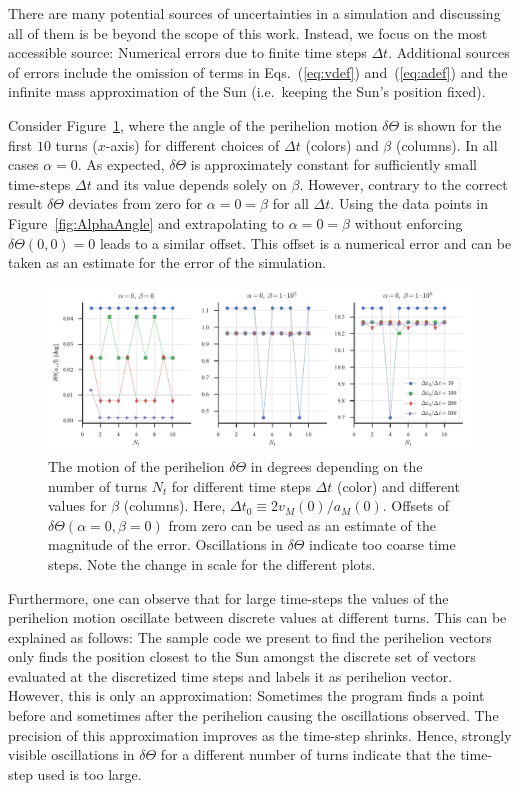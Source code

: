 \documentclass[12pt,ngerman,american]{iopart}
\begin{document}
There are many potential sources of uncertainties in a simulation and discussing all of them is be beyond the scope of this work.
Instead, we focus on the most accessible source: Numerical errors due to finite time steps $\Delta t$.
Additional sources of errors include the omission of terms in Eqs.~(\ref{eq:vdef}) and~(\ref{eq:adef}) and the infinite mass approximation of the Sun (i.e.\ keeping the Sun's position fixed).

Consider Figure~\ref{fcc3}, where the angle of the perihelion motion $\delta \Theta$ is shown for the first $10$ turns ($x$-axis) for different choices of $\Delta t$ (colors) and $\beta$ (columns). In all cases $\alpha=0$.
As expected, $\delta\Theta$ is approximately constant for sufficiently small time-steps $\Delta t$ and its value depends solely on $\beta$.
However, contrary to the correct result $\delta\Theta$ deviates from zero for $\alpha = 0 = \beta$ for all $\Delta t$.
Using the data points in Figure~\ref{fig:AlphaAngle} and extrapolating to $\alpha = 0 = \beta$ without enforcing $\delta\Theta(0,0) = 0$ leads to a similar offset.
This offset is a numerical error and can be taken as an estimate for the error of the simulation.

\begin{figure}[htb]
	\centering
	\includegraphics[width=.99\textwidth]{figs/angular-variaton.pdf}
	\caption{\label{fcc3}The motion of the perihelion $\delta\Theta$ in degrees depending on the number of turns $N_t$ for different time steps $\Delta t$ (color) and different values for $\beta$ (columns).
	Here, $\Delta t_0 \equiv 2 v_M(0)/a_M(0)$.
	Offsets of $\delta \Theta(\alpha=0, \beta=0)$ from zero can be used as an estimate of the magnitude of the error. Oscillations in $\delta \Theta$ indicate too coarse time steps. 
	Note the change in scale for the different plots.
}
\end{figure}

Furthermore, one can observe that for large time-steps the values of the perihelion motion oscillate between discrete values at different turns.
This can be explained as follows: The sample code we present to find the perihelion vectors only finds the position closest to the Sun amongst
the discrete set of vectors evaluated at the discretized time steps and labels it as perihelion vector. However,
this is only an approximation: Sometimes the program finds a point before and sometimes after the perihelion causing the oscillations observed.
The precision of this approximation improves as the time-step shrinks.
Hence, strongly visible oscillations in $\delta\Theta$ for a different number of turns indicate that the time-step used is too large.
\end{document}
